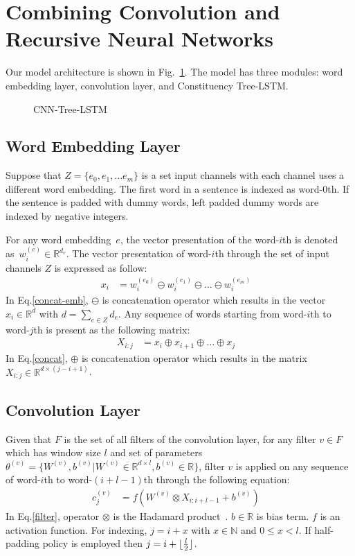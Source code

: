 \section{Combining Convolution and Recursive Neural Networks}\label{sec:cnn-treelstm}

Our model architecture is shown in Fig.~\ref{fig:cnntreelstm}.
The model has three modules: word embedding layer, convolution layer, and Constituency Tree-LSTM.

\begin{figure} [H]
    \centering
    
    \caption[CNN-Tree-LSTM]{CNN-Tree-LSTM}
    \label{fig:cnntreelstm} %
\end{figure}

\subsection{Word Embedding Layer}
Suppose that \(Z = \{e_0, e_1, \ldots e_m\}\) is a set input channels with each channel uses a different word embedding.
The first word in a sentence is indexed as word-\(0\)th.
If the sentence is padded with dummy words, left padded dummy words are indexed by negative integers.

For any word embedding~\(e\), the vector presentation of the word-\(i\)th is denoted as~\(w^{(e)}_i \in \mathbb{R}^{d_e}\).
The vector presentation of word-\(i\)th through the set of input channels \(Z\) is expressed as follow:
\begin{align}
 x_i &= w^{(e_0)}_i \ominus w^{(e_1)}_i \ominus  \ldots \ominus w^{(e_m)}_i&\label{concat-emb}
\end{align}
In Eq.\eqref{concat-emb}, \(\ominus\) is concatenation operator which results in the vector \(x_i \in \mathbb{R}^{d}\) with \(d = \sum_{e \in Z} d_e\).
Any sequence of words starting from word-\(i\)th to word-\(j\)th is present as the following matrix:
\begin{align}
X_{i:j} &= x_i \oplus x_{i+1} \oplus \ldots \oplus x_j &\label{concat}
\end{align}
In Eq.\eqref{concat}, \(\oplus\) is concatenation operator which results in the matrix \(X_{i:j} \in \mathbb{R}^{d \times (j-i+1)}\).
\subsection{Convolution Layer}\label{sec:cnn}
Given that \(F\) is the set of all filters of the convolution layer, for any filter \(v \in F\) which has window size \(l\) and set of parameters \(\theta^{(v)} = \{ W^{(v)}, b^{(v)} | W^{(v)} \in \mathbb{R}^{d \times l}, b^{(v)} \in \mathbb{R}\}\), filter \({v}\) is applied on any sequence of word-\(i\)th to word-\((i+l-1)\)th through the following equation:
\begin{align}
c^{(v)}_j &= f(W^{(v)} \otimes X_{i:i+l-1} + b^{(v)}) &\label{filter}
\end{align}
In Eq.\eqref{filter}, operator \(\otimes\) is the Hadamard product~\cite{element-prod}.
\(b \in \mathbb{R}\) is bias term. \(f\) is an activation function.
For indexing, \(j = i + x\) with \(x \in \mathbb{N}\) and \(0 \leq x < l\).
If half-padding policy is employed then \(j = i + \lfloor \frac{l}{2} \rfloor\).

